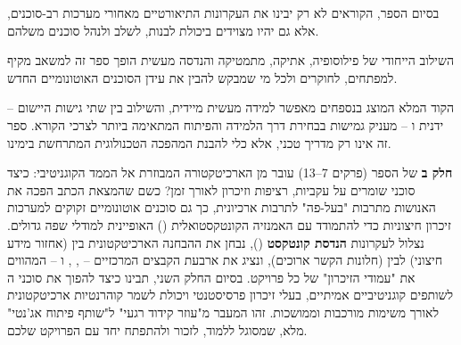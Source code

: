 בסיום הספר, הקוראים לא רק יבינו את העקרונות התיאורטיים מאחורי מערכות רב-סוכנים, אלא גם יהיו מצוידים ביכולת לבנות, לשלב ולנהל סוכנים משלהם.

השילוב הייחודי של פילוסופיה, אתיקה, מתמטיקה והנדסה מעשית הופך ספר זה למשאב מקיף למפתחים, לחוקרים ולכל מי שמבקש להבין את עידן הסוכנים האוטונומיים החדש.

הקוד המלא המוצג בנספחים מאפשר למידה מעשית מיידית, והשילוב בין שתי גישות היישום – ידנית ו – מעניק גמישות בבחירת דרך הלמידה והפיתוח המתאימה ביותר לצרכי הקורא. ספר זה אינו רק מדריך טכני, אלא כלי להבנת המהפכה הטכנולוגית המתרחשת בימינו.


\textbf{חלק ב} של הספר (פרקים \num{7}–\num{13}) עובר מן הארכיטקטורה המבוזרת אל הממד הקוגניטיבי: כיצד סוכני  שומרים על עקביות, רציפות וזיכרון לאורך זמן? כשם שהמצאת הכתב הפכה את האנושות מתרבות "בעל-פה" לתרבות ארכיונית, כך גם סוכנים אוטונומיים זקוקים למערכות זיכרון חיצוניות כדי להתמודד עם האמנזיה הקונטקסטואלית () האופיינית למודלי שפה גדולים. נצלול לעקרונות \textbf{הנדסת קונטקסט} (), נבחן את ההבחנה הארכיטקטונית בין  (אחזור מידע חיצוני) לבין  (חלונות הקשר ארוכים), ונציג את ארבעת הקבצים המרכזיים – , ,  ו – המהווים את "עמודי הזיכרון" של כל פרויקט. בסיום החלק השני, תבינו כיצד להפוך את סוכני ה לשותפים קוגניטיביים אמיתיים, בעלי זיכרון פרסיסטנטי ויכולת לשמר קוהרנטיות ארכיטקטונית לאורך משימות מורכבות וממושכות. זהו המעבר מ"עוזר קידוד רגעי" ל"שותף פיתוח אג'נטי" מלא, שמסוגל ללמוד, לזכור ולהתפתח יחד עם הפרויקט שלכם.
